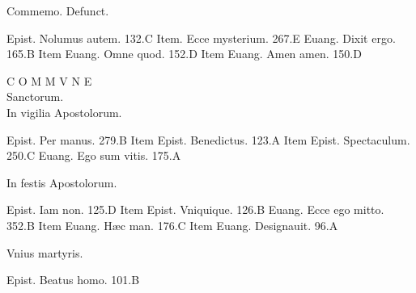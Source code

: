 \documentclass[a5paper,10pt]{book}
\def\ae{æ}
\begin{document}
\begin{multicols}{2}
\newline \vspace{-1.75em}
\begin{center}
\color{red} Commemo. Defunct.
\end{center}
\vspace{-.75em}
\par \noindent Epist. Nolumus autem. \hfill 132.C
\newline Item. Ecce mysterium. \hfill 267.E
\newline Euang. Dixit ergo. \hfill 165.B
\newline Item Euang. Omne quod. \hfill 152.D
\newline Item Euang. Amen amen. \hfill 150.D
\newline \vspace{-1.75em}
\begin{center}
\color{red} \large C O M M V N E\\
\normalsize Sanctorum.\\
In vigilia Apostolorum.
\end{center}
\vspace{-.75em}
\par \noindent Epist. Per manus. \hfill 279.B
\newline Item Epist. Benedictus. \hfill 123.A
\newline Item Epist. Spectaculum. \hfill 250.C
\newline Euang. Ego sum vitis. \hfill 175.A
\newline \vspace{-1.75em}
\begin{center}
\color{red} In festis Apostolorum.
\end{center}
\vspace{-.75em}
\par \noindent Epist. Iam non. \hfill 125.D
\newline Item Epist. Vniquique. \hfill 126.B
\newline Euang. Ecce ego mitto. \hfill 352.B
\newline Item Euang. H\ae c man. \hfill 176.C
\newline Item Euang. Designauit. \hfill 96.A
\newline \vspace{-1.75em}
\begin{center}
\color{red} Vnius martyris.
\end{center}
\vspace{-.75em}
\par \noindent Epist. Beatus homo. \hfill 101.B

\end{multicols}
\end{document}
